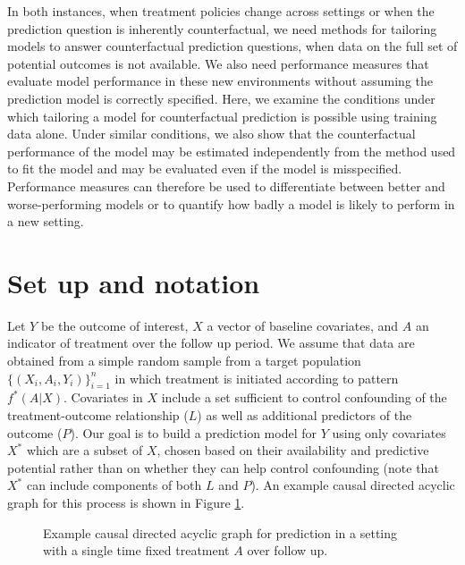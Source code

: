 In both instances, when treatment policies change across settings or when the prediction question is inherently counterfactual, we need methods for tailoring models to answer counterfactual prediction questions, when data on the full set of potential outcomes is not available. We also need performance measures that evaluate model performance in these new environments without assuming the prediction model is correctly specified. Here, we examine the conditions under which tailoring a model for counterfactual prediction is possible using training data alone. Under similar conditions, we also show that the counterfactual performance of the model may be estimated independently from the method used to fit the model and may be evaluated even if the model is misspecified. Performance measures can therefore be used to differentiate between better and worse-performing models or to quantify how badly a model is likely to perform in a new setting. 


\section{Set up and notation} \label{sec:setup}
Let $Y$ be the outcome of interest, $X$ a vector of baseline covariates, and $A$ an indicator of treatment over the follow up period. We assume that data are obtained from a simple random sample from a target population $\{(X_i, A_i, Y_i)\}_{i=1}^n$ in which treatment is initiated according to pattern $f^*(A | X)$. Covariates in $X$ include a set sufficient to control confounding of the treatment-outcome relationship ($L$) as well as additional predictors of the outcome ($P$). Our goal is to build a prediction model for $Y$ using only covariates $X^*$ which are a subset of $X$, chosen based on their availability and predictive potential rather than on whether they can help control confounding (note that $X^*$ can include components of both $L$ and $P$). An example causal directed acyclic graph for this process is shown in Figure \ref{fig:dag1}. 

\begin{figure}[t]
    \centering
    \caption{Example causal directed acyclic graph for prediction in a setting with a single time fixed treatment $A$ over follow up.}
    \label{fig:dag1}
\end{figure}

